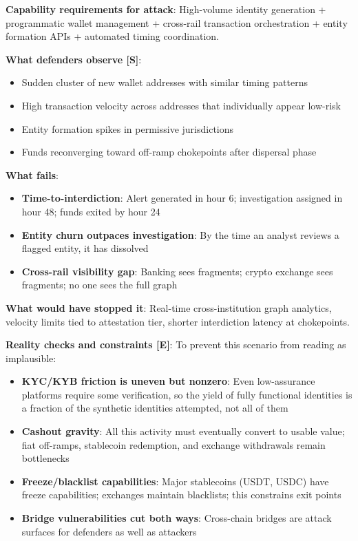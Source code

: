 \documentclass[11pt,letterpaper]{article}
\begin{document}
\begin{scenariobox}
\textbf{Capability requirements for attack}: High-volume identity generation + programmatic wallet management + cross-rail transaction orchestration + entity formation APIs + automated timing coordination.

\textbf{What defenders observe [S]}:
\begin{itemize}
  \item Sudden cluster of new wallet addresses with similar timing patterns
  \item High transaction velocity across addresses that individually appear low-risk
  \item Entity formation spikes in permissive jurisdictions
  \item Funds reconverging toward off-ramp chokepoints after dispersal phase
\end{itemize}

\textbf{What fails}:
\begin{itemize}
  \item \textbf{Time-to-interdiction}: Alert generated in hour 6; investigation assigned in hour 48; funds exited by hour 24
  \item \textbf{Entity churn outpaces investigation}: By the time an analyst reviews a flagged entity, it has dissolved
  \item \textbf{Cross-rail visibility gap}: Banking sees fragments; crypto exchange sees fragments; no one sees the full graph
\end{itemize}

\textbf{What would have stopped it}: Real-time cross-institution graph analytics, velocity limits tied to attestation tier, shorter interdiction latency at chokepoints.

\textbf{Reality checks and constraints [E]}: To prevent this scenario from reading as implausible:
\begin{itemize}
  \item \textbf{KYC/KYB friction is uneven but nonzero}: Even low-assurance platforms require some verification, so the yield of fully functional identities is a fraction of the synthetic identities attempted, not all of them
  \item \textbf{Cashout gravity}: All this activity must eventually convert to usable value; fiat off-ramps, stablecoin redemption, and exchange withdrawals remain bottlenecks
  \item \textbf{Freeze/blacklist capabilities}: Major stablecoins (USDT, USDC) have freeze capabilities; exchanges maintain blacklists; this constrains exit points
  \item \textbf{Bridge vulnerabilities cut both ways}: Cross-chain bridges are attack surfaces for defenders as well as attackers
\end{itemize}


\end{scenariobox}
\end{document}
